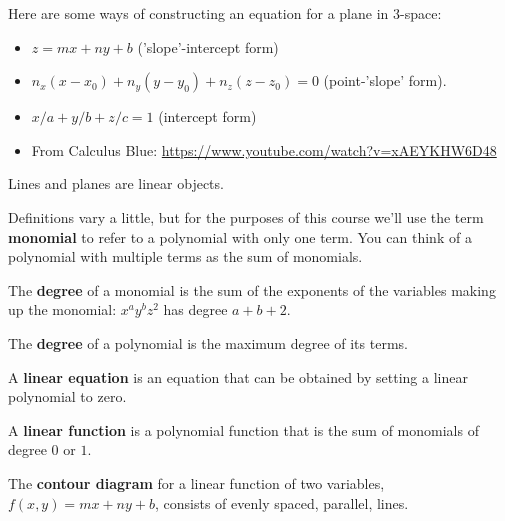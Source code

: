 \documentclass[12pt,letterpaper,noanswers]{exam}
\begin{document}
Here are some ways of constructing an equation for a plane in $3$-space:
\begin{itemize}
    \item $z = mx + ny + b$ ('slope'-intercept form)
    \item $n_x(x-x_0) + n_y(y-y_0) +n_z(z-z_0) = 0$ (point-'slope' form).  
    \item $x/a+y/b + z/c= 1$ (intercept form)
    \item From Calculus Blue: \url{https://www.youtube.com/watch?v=xAEYKHW6D48}
\end{itemize}

Lines and planes are linear objects.

\begin{tcolorbox}
Definitions vary a little, but for the purposes of this course we'll use the term \textbf{monomial} to refer to a polynomial with only one term.  You can think of a polynomial with multiple terms as the sum of monomials.

The \textbf{degree} of a monomial is the sum of the exponents of the variables making up the monomial: $x^ay^bz^2$ has degree $a+b+2$.

The \textbf{degree} of a polynomial is the maximum degree of its terms.

A \textbf{linear equation} is an equation that can be obtained by setting a linear polynomial to zero.

A \textbf{linear function} is a polynomial function that is the sum of monomials of degree $0$ or $1$.


The \textbf{contour diagram} for a linear function of two variables, $f(x,y) = mx + ny + b$, consists of evenly spaced, parallel, lines. 

\end{tcolorbox}
\end{document}
